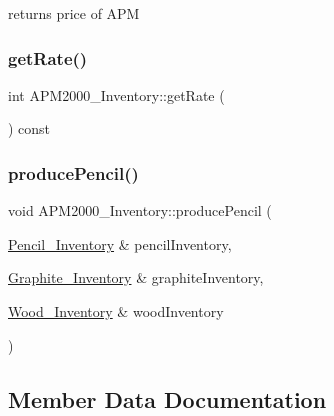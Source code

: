 returns price of A\+PM 

\mbox{\label{classAPM2000__Inventory_ab20a0adafade1bdefea0e8d8c6b271a0}} 
\subsubsection{\texorpdfstring{get\+Rate()}{getRate()}}
{\footnotesize\ttfamily int A\+P\+M2000\+\_\+\+Inventory\+::get\+Rate (\begin{DoxyParamCaption}{ }\end{DoxyParamCaption}) const}

\mbox{\label{classAPM2000__Inventory_ad7ffc7e7536509d26d76800b2398bfc0}} 
\subsubsection{\texorpdfstring{produce\+Pencil()}{producePencil()}}
{\footnotesize\ttfamily void A\+P\+M2000\+\_\+\+Inventory\+::produce\+Pencil (\begin{DoxyParamCaption}\item[{\hyperlink{classPencil__Inventory}{Pencil\+\_\+\+Inventory} \&}]{pencil\+Inventory,  }\item[{\hyperlink{classGraphite__Inventory}{Graphite\+\_\+\+Inventory} \&}]{graphite\+Inventory,  }\item[{\hyperlink{classWood__Inventory}{Wood\+\_\+\+Inventory} \&}]{wood\+Inventory }\end{DoxyParamCaption})}



\subsection{Member Data Documentation}
\mbox{\label{classAPM2000__Inventory_a098109b5a53ce171fb405e552bf056b2}} 
